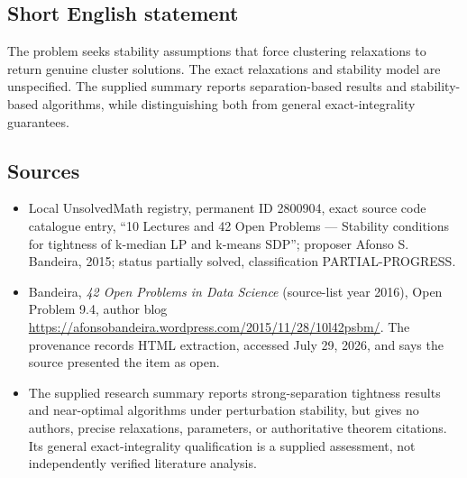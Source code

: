 \documentclass[11pt]{article}
\begin{document}
\subsection{Short English statement}
The problem seeks stability assumptions that force clustering relaxations to return genuine cluster solutions. The exact relaxations and stability model are unspecified. The supplied summary reports separation-based results and stability-based algorithms, while distinguishing both from general exact-integrality guarantees.
\subsection{Sources}
\begin{itemize}
\item Local UnsolvedMath registry, permanent ID 2800904, exact source code catalogue entry, ``10 Lectures and 42 Open Problems --- Stability conditions for tightness of k-median LP and k-means SDP''; proposer Afonso S. Bandeira, 2015; status partially solved, classification PARTIAL-PROGRESS.
\item Bandeira, \emph{42 Open Problems in Data Science} (source-list year 2016), Open Problem 9.4, author blog \url{https://afonsobandeira.wordpress.com/2015/11/28/10l42psbm/}. The provenance records HTML extraction, accessed July 29, 2026, and says the source presented the item as open.
\item The supplied research summary reports strong-separation tightness results and near-optimal algorithms under perturbation stability, but gives no authors, precise relaxations, parameters, or authoritative theorem citations. Its general exact-integrality qualification is a supplied assessment, not independently verified literature analysis.
\end{itemize}
\end{document}
